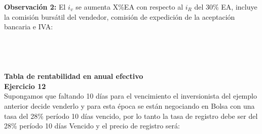 	\textbf{Observación 2:} El $i_{v}$ se aumenta X\%EA con respecto al $i_{R}$ del 30\% EA, incluye la comisión bursátil del vendedor, comisión de expedición de la aceptación bancaria e IVA:\\
	\\
	\\
	\\
	\\
	\textbf{Tabla de rentabilidad en anual efectivo}\\
	
	\textbf{Ejercicio 12}\\
	
	Supongamos que faltando 10 días para el vencimiento el inversionista del ejemplo anterior decide venderlo y para esta época se están negociando en Bolsa con una tasa del 28\% período 10 días vencido, por lo tanto la tasa de registro debe ser del 28\% período 10 días Vencido y el precio de registro será: \\
